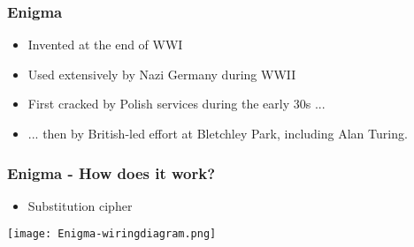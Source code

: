 \documentclass[
hyperref={pdfpagelabels=false}
,xcolor=table
]
{beamer}
\begin{document}
  


\begin{frame}
  \frametitle{Enigma}

  \begin{itemize}
  \item Invented at the end of WWI
  \item Used extensively by Nazi Germany during WWII
  \item First cracked by Polish services during the early 30s ... 
  \item ... then by British-led effort at Bletchley Park, including Alan Turing. 
  \end{itemize}
\end{frame}


\begin{frame}
  \frametitle{Enigma - How does it work?}

  \begin{itemize}
  \item Substitution cipher
  \end{itemize}

  \begin{center}
    \texttt{[image: Enigma-wiringdiagram.png]}
  \end{center}
 
\end{frame}
\end{document}
